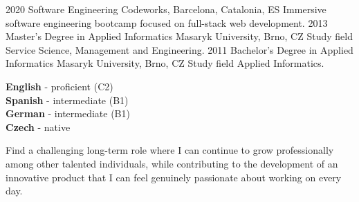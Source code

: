 \documentclass[9pt]{developercv}
\begin{document}

\begin{entrylist}
  \entry
  {2020}
  {Software Engineering}
  {Codeworks, Barcelona, Catalonia, ES}
  {Immersive software engineering bootcamp focused on full-stack web development.}
  \entry
  {2013}
  {Master's Degree in Applied Informatics}
  {Masaryk University, Brno, CZ}
  {Study field Service Science, Management and Engineering.}
  \entry
  {2011}
  {Bachelor's Degree  in Applied Informatics}
  {Masaryk University, Brno, CZ}
  {Study field Applied Informatics.}
\end{entrylist}


\begin{minipage}[t]{0.45\textwidth}
  \vspace{-\baselineskip}


  \textbf{English} - proficient (C2)\\
  \textbf{Spanish} - intermediate (B1)\\
  \textbf{German} - intermediate (B1)\\
  \textbf{Czech} - native
\end{minipage}
\begin{minipage}[t]{0.55\textwidth}
  \vspace{-\baselineskip}


  Find a challenging long-term role where I can continue to grow professionally among other talented individuals, while contributing to the development of an innovative product that I can feel genuinely passionate about working on every day.
\end{minipage}
\end{document}
